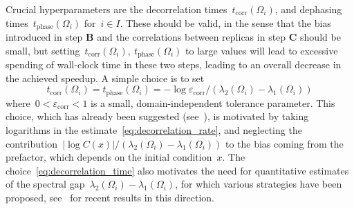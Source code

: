 \documentclass[a4]{article}
\newcommand{\1}{\mathbbm 1}
\newcommand{\corr}{\mathrm{corr}}
\newcommand{\phase}{\mathrm{phase}}
\begin{document}
    Crucial hyperparameters are the decorrelation times~$t_{\corr}(\Omega_i)$, and dephasing times~$t_{\phase}(\Omega_i)$ for~$i\in I$. These should be valid, in the sense that the bias introduced in step {\bf B} and the correlations between replicas in step {\bf C} should be small, but setting~$t_{\corr}(\Omega_i),~t_{\phase}(\Omega_i)$ to large values will lead to excessive spending of wall-clock time in these two steps, leading to an overall decrease in the achieved speedup.
    A simple choice is to set
    \begin{equation}
        \label{eq:decorrelation_time}
        t_{\corr}(\Omega_i)=t_{\phase}(\Omega_i) = -\log\varepsilon_{\corr}/(\lambda_2(\Omega_i)-\lambda_1(\Omega_i))
    \end{equation} where~$0<\varepsilon_{\corr}<1$ is a small, domain-independent tolerance parameter.
    This choice, which has already been suggested (see~\cite{SL13,PUV15}), is motivated by taking logarithms in the estimate~\eqref{eq:decorrelation_rate}, and neglecting the contribution~$|\log C(x)|/(\lambda_2(\Omega_i)-\lambda_1(\Omega_i))$ to the bias coming from the prefactor, which depends on the initial condition~$x$.
    The choice~\eqref{eq:decorrelation_time} also motivates the need for quantitative estimates of the spectral gap~$\lambda_2(\Omega_i)-\lambda_1(\Omega_i)$, for which various strategies have been proposed, see~\cite[Section 3.3]{BLS24} for recent results in this direction.
\end{document}
